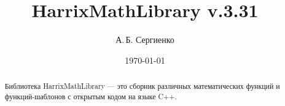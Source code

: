 \documentclass[a4paper,12pt]{article}
\title{HarrixMathLibrary v.3.31}
\author{А.\,Б. Сергиенко}
\date{\today}
\begin{document}


\maketitle

\begin{abstract}
Библиотека HarrixMathLibrary --- это сборник различных математических функций и функций-шаблонов с открытым кодом на языке C++.
\end{abstract}

\tableofcontents
\end{document}
